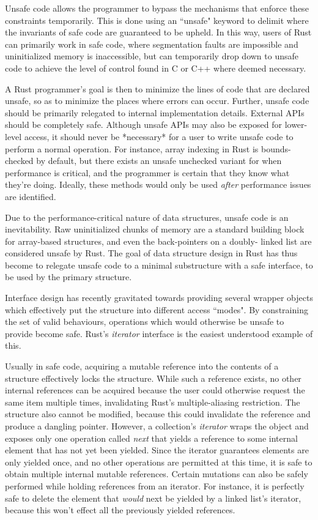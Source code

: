 \documentclass{cccg13}
\begin{document}
Unsafe code allows the programmer to bypass the mechanisms that enforce these
constraints temporarily. This is done using an ``unsafe" keyword to delimit
where the invariants of safe code are guaranteed to be upheld. In this way,
users of Rust can primarily work in safe code, where segmentation faults are
impossible and uninitialized memory is inaccessible, but can temporarily drop
down to unsafe code to achieve the level of control found in C or C++ where
deemed necessary.

A Rust programmer's goal is then to minimize the lines of code that are
declared unsafe, so as to minimize the places where errors can occur. Further,
unsafe code should be primarily relegated to internal implementation details.
External APIs should be completely safe. Although unsafe APIs may also be
exposed for lower-level access, it should never be *necessary* for a user to
write unsafe code to perform a normal operation. For instance, array indexing
in Rust is bounds-checked by default, but there exists an unsafe unchecked
variant for when performance is critical, and the programmer is certain that
they know what they're doing. Ideally, these methods would only be used
\emph{after} performance issues are identified.

Due to the performance-critical nature of data structures, unsafe code is an
inevitability. Raw uninitialized chunks of memory are a standard building
block for array-based structures, and even the back-pointers on a doubly-
linked list are considered unsafe by Rust. The goal of data structure design
in Rust has thus become to relegate unsafe code to a minimal substructure with
a safe interface, to be used by the primary structure.

Interface design has recently gravitated towards providing several wrapper
objects which effectively put the structure into different access ``modes". By
constraining the set of valid behaviours, operations which would otherwise be
unsafe to provide become safe. Rust's \emph{iterator} interface is the easiest
understood example of this.

Usually in safe code, acquiring a mutable reference into the contents of a
structure effectively locks the structure. While such a reference exists, no
other internal references can be acquired because the user could otherwise
request the same item multiple times, invalidating Rust's multiple-aliasing
restriction. The structure also cannot be modified, because this could
invalidate the reference and produce a dangling pointer. However, a
collection's \emph{iterator} wraps the object and exposes only one operation
called \emph{next} that yields a reference to some internal element that has
not yet been yielded. Since the iterator guarantees elements are only yielded
once, and no other operations are permitted at this time, it is safe to obtain
multiple internal mutable references. Certain mutations can also be safely
performed while holding references from an iterator. For instance, it is
perfectly safe to delete the element that \emph{would} next be yielded by a
linked list's iterator, because this won't effect all the previously yielded
references.
\end{document}
